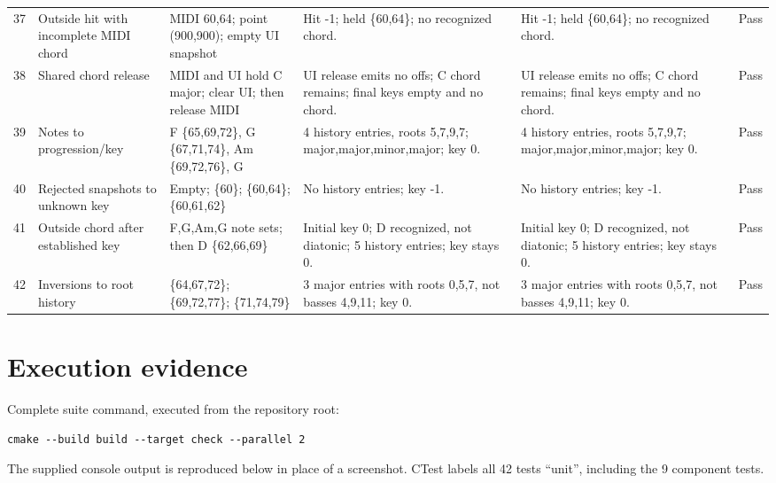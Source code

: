 \documentclass[10pt,letterpaper]{article}
\begin{document}
\begin{landscape}
\begin{longtable}{P{0.6cm}P{3.0cm}P{4.0cm}P{6.8cm}P{6.8cm}P{0.8cm}}
37 & Outside hit with incomplete MIDI chord & MIDI 60,64; point (900,900); empty UI snapshot & Hit -1; held \{60,64\}; no recognized chord. & Hit -1; held \{60,64\}; no recognized chord. & Pass \\
38 & Shared chord release & MIDI and UI hold C major; clear UI; then release MIDI & UI release emits no offs; C chord remains; final keys empty and no chord. & UI release emits no offs; C chord remains; final keys empty and no chord. & Pass \\
39 & Notes to progression/key & F \{65,69,72\}, G \{67,71,74\}, Am \{69,72,76\}, G & 4 history entries, roots 5,7,9,7; major,major,minor,major; key 0. & 4 history entries, roots 5,7,9,7; major,major,minor,major; key 0. & Pass \\
40 & Rejected snapshots to unknown key & Empty; \{60\}; \{60,64\}; \{60,61,62\} & No history entries; key -1. & No history entries; key -1. & Pass \\
41 & Outside chord after established key & F,G,Am,G note sets; then D \{62,66,69\} & Initial key 0; D recognized, not diatonic; 5 history entries; key stays 0. & Initial key 0; D recognized, not diatonic; 5 history entries; key stays 0. & Pass \\
42 & Inversions to root history & \{64,67,72\}; \{69,72,77\}; \{71,74,79\} & 3 major entries with roots 0,5,7, not basses 4,9,11; key 0. & 3 major entries with roots 0,5,7, not basses 4,9,11; key 0. & Pass \\
\end{longtable}
\end{landscape}
\normalsize

\section{Execution evidence}\label{sec:output}
Complete suite command, executed from the repository root:
\begin{lstlisting}
cmake --build build --target check --parallel 2
\end{lstlisting}
The supplied console output is reproduced below in place of a screenshot.
CTest labels all 42 tests ``unit'', including the 9 component tests.
\end{document}
